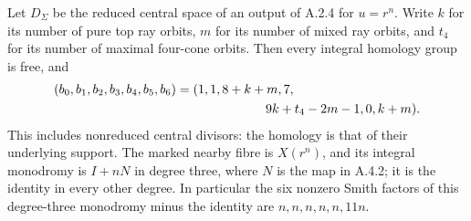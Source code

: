 \begin{theorem}\label{push:A48}
Let $D_\Sigma$ be the reduced central space of an output of
A.2.4 for $u=r^n$. Write $k$ for its number of pure top
ray orbits, $m$ for its number of mixed ray orbits, and
$t_4$ for its number of maximal four-cone orbits. Then
every integral homology group is free, and
\[
 \begin{split}
 (b_0,b_1,b_2,b_3,b_4,b_5,b_6)
   ={}&(1,1,8+k+m,7,\\
       &\hspace{20mm}9k+t_4-2m-1,0,k+m).
 \end{split}
\]
This includes nonreduced central divisors: the homology
is that of their underlying support. The marked nearby
fibre is $X(r^n)$, and its integral monodromy is
$I+nN$ in degree three, where $N$ is the map in A.4.2;
it is the identity in every other degree. In particular
the six nonzero Smith factors of this degree-three
monodromy minus the identity are
$n,n,n,n,n,11n$.
\end{theorem}
